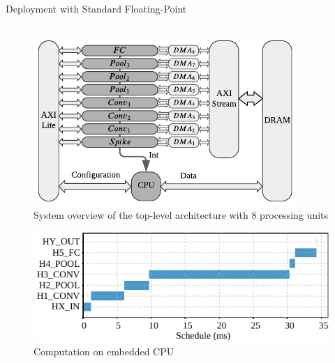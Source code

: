 \begin{frame}{Deployment with Standard Floating-Point}
	\begin{columns}
		\begin{column}{0.5\textwidth}
			\begin{minipage}[c][.45\textheight][c]{\linewidth}
				\centering
				\begin{figure}
					\includegraphics[width=0.75\linewidth]{./slides/figures/sbs_hw_experimental.pdf} %
					\caption{System overview of the top-level architecture with 8 processing units}
				\end{figure}
				\pause
			\end{minipage}
			
			\begin{minipage}[c][.45\textheight][c]{\linewidth}
				\centering
				\begin{figure}
					\includegraphics[width=0.75\linewidth]{../chapters/sbs_accelerator/figures/latency_sw.pdf} %
					\caption{Computation on embedded CPU}
				\end{figure}
				\pause
			\end{minipage}
		\end{column}
		

\end{columns}
\end{frame}
